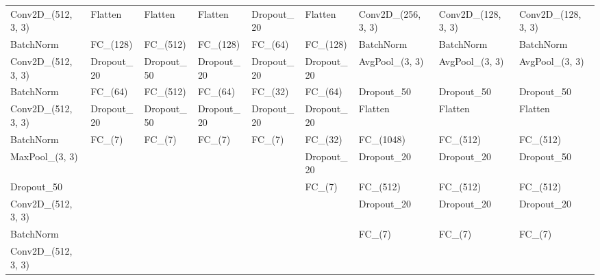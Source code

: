 \begin{table}[!htb]
{\begin{tabular}{@{}lllllllll@{}}
Conv2D\_(512, 3, 3)   & Flatten               & Flatten               & Flatten               & Dropout\_20           & Flatten               & Conv2D\_(256, 3, 3)   & Conv2D\_(128, 3, 3)   & Conv2D\_(128, 3, 3)   \\
BatchNorm             & FC\_(128)             & FC\_(512)             & FC\_(128)             & FC\_(64)              & FC\_(128)             & BatchNorm             & BatchNorm             & BatchNorm             \\
Conv2D\_(512, 3, 3)   & Dropout\_20           & Dropout\_50           & Dropout\_20           & Dropout\_20           & Dropout\_20           & AvgPool\_(3, 3)       & AvgPool\_(3, 3)       & AvgPool\_(3, 3)       \\
BatchNorm             & FC\_(64)              & FC\_(512)             & FC\_(64)              & FC\_(32)              & FC\_(64)              & Dropout\_50           & Dropout\_50           & Dropout\_50           \\
Conv2D\_(512, 3, 3)   & Dropout\_20           & Dropout\_50           & Dropout\_20           & Dropout\_20           & Dropout\_20           & Flatten               & Flatten               & Flatten               \\
BatchNorm             & FC\_(7)               & FC\_(7)               & FC\_(7)               & FC\_(7)               & FC\_(32)              & FC\_(1048)            & FC\_(512)             & FC\_(512)             \\
MaxPool\_(3, 3)       &                       &                       &                       &                       & Dropout\_20           & Dropout\_20           & Dropout\_20           & Dropout\_50           \\
Dropout\_50           &                       &                       &                       &                       & FC\_(7)               & FC\_(512)             & FC\_(512)             & FC\_(512)             \\
Conv2D\_(512, 3, 3)   &                       &                       &                       &                       &                       & Dropout\_20           & Dropout\_20           & Dropout\_20           \\
BatchNorm             &                       &                       &                       &                       &                       & FC\_(7)               & FC\_(7)               & FC\_(7)               \\
Conv2D\_(512, 3, 3)   &                       &                       &                       &                       &                       &                       &                       &                       \\

\end{tabular}}
\end{table}
